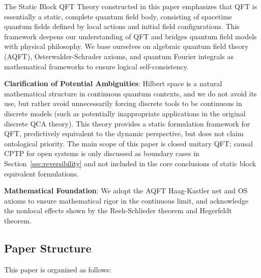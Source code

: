 \documentclass[11pt]{article}
\theoremstyle{definition}
\theoremstyle{remark}
\begin{document}
The Static Block QFT Theory constructed in this paper emphasizes that QFT is essentially a static, complete quantum field body, consisting of spacetime quantum fields defined by local actions and initial field configurations. This framework deepens our understanding of QFT and bridges quantum field models with physical philosophy. We base ourselves on algebraic quantum field theory (AQFT), Osterwalder-Schrader axioms, and quantum Fourier integrals as mathematical frameworks to ensure logical self-consistency.

\textbf{Clarification of Potential Ambiguities}: Hilbert space is a natural mathematical structure in continuous quantum contexts, and we do not avoid its use, but rather avoid unnecessarily forcing discrete tools to be continuous in discrete models (such as potentially inappropriate applications in the original discrete QCA theory). This theory provides a static formulation framework for QFT, predictively equivalent to the dynamic perspective, but does not claim ontological priority. The main scope of this paper is closed unitary QFT; causal CPTP for open systems is only discussed as boundary cases in Section~\ref{sec:reversibility} and not included in the core conclusions of static block equivalent formulations.

\textbf{Mathematical Foundation}: We adopt the AQFT Haag-Kastler net and OS axioms to ensure mathematical rigor in the continuous limit, and acknowledge the nonlocal effects shown by the Reeh-Schlieder theorem and Hegerfeldt theorem.

\subsection{Paper Structure}

This paper is organized as follows:
\end{document}
